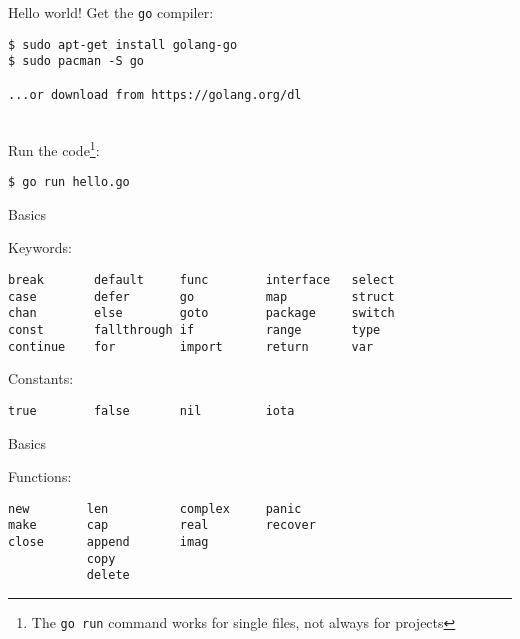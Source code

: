 \documentclass[10pt]{beamer}
\begin{document}
	
	\begin{frame}[t,fragile]{Hello world!}
		Get the \texttt{go} compiler:
		\begin{verbatim}
$ sudo apt-get install golang-go
$ sudo pacman -S go

...or download from https://golang.org/dl
		\end{verbatim}
		\\
		Run the code\footnote{The \texttt{go run} command works for single files, not always for projects}:
		\begin{verbatim}
$ go run hello.go
		\end{verbatim}
\end{frame}
	
	
	\begin{frame}[t,fragile]{Basics}
		\begin{center}
			Keywords:
		\end{center}
		\begin{verbatim}
break       default     func        interface   select
case        defer       go          map         struct
chan        else        goto        package     switch
const       fallthrough if          range       type
continue    for         import      return      var
		\end{verbatim}
		\vspace*{-4ex}
		\begin{center}
			Constants:
		\end{center}
		\begin{verbatim}
true        false       nil         iota
		\end{verbatim}
\end{frame}


	\begin{frame}[t,fragile]{Basics}
		\begin{center}
			Functions:
		\end{center}
		\begin{verbatim}
new        len          complex     panic
make       cap          real        recover
close      append       imag
           copy 
           delete
		\end{verbatim}
\end{frame}
\end{document}
